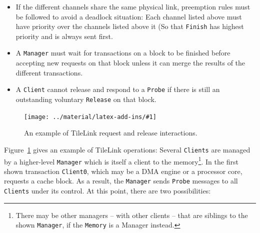 \documentclass[journal,a4paper]{IEEEtran}
\newcommand*{\COMPILEIMAGES}{}%
\newcommand\inputimage[1]{%
	\ifdefined\COMPILEIMAGES
		
	\else
		\texttt{[image: ../material/latex-add-ins/\#1]}
	\fi
}
\begin{document}
\begin{itemize}
	\item If the different channels share the same physical link, preemption rules must be followed to avoid a deadlock situation: Each channel listed above must have priority over the channels listed above it (So that \texttt{Finish} has highest priority and is always sent first.
	\item A \texttt{Manager} must wait for transactions on a block to be finished before accepting new requests on that block unless it can merge the results of the different transactions.
	\item A \texttt{Client} cannot release and respond to a \texttt{Probe} if there is still an outstanding voluntary \texttt{Release} on that block.
\end{itemize}


\begin{figure}%
	\centering
	\inputimage{image3}
	\caption{An example of TileLink request and release interactions.}
	\label{tile-transfer}
\end{figure}
Figure~\ref{tile-transfer} gives an example of TileLink operations: Several \texttt{Clients} are managed by a higher-level \texttt{Manager} which is itself a client to the memory\footnote{There may be other managers -- with other clients -- that are siblings to the shown \texttt{Manager}, if the \texttt{Memory} is a Manager instead.}.
In the first shown transaction \texttt{Client0}, which may be a DMA engine or a processor core, requests a cache block. As a result, the \texttt{Manager} sends \texttt{Probe} messages to all \texttt{Clients} under its control.
At this point, there are two possibilities:
\end{document}
